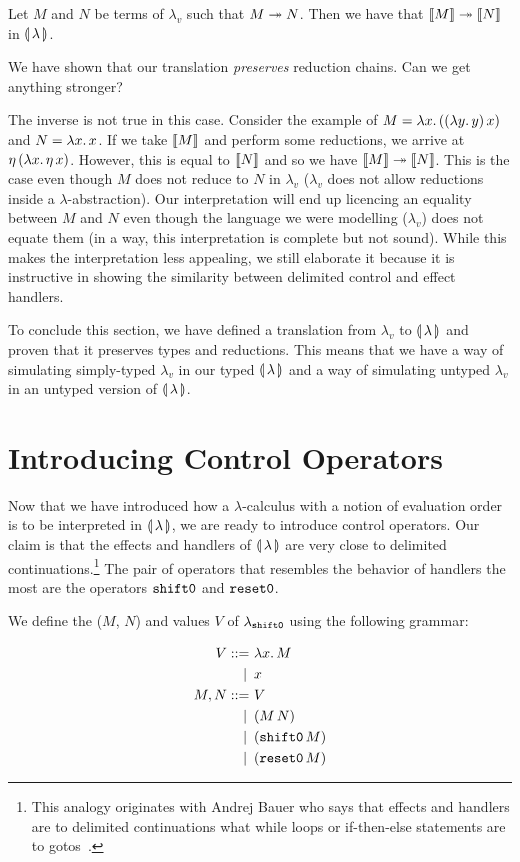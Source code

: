 \begin{corollary}
  Let $M$ and $N$ be terms of $\lambda_v$ such that $M \twoheadrightarrow N$. Then we
  have that $\llbracket M \rrbracket \twoheadrightarrow \llbracket N \rrbracket$ in $\llparenthesis \, \lambda \, \rrparenthesis$.
\end{corollary}

We have shown that our translation \emph{preserves} reduction chains. Can
we get anything stronger?

The inverse is not true in this case. Consider the example of
$M = \lambda x.\, ((\lambda y.\, y)\,x)$ and $N = \lambda x.\, x$. If we take
$\llbracket M \rrbracket$ and perform some reductions, we arrive at
$\eta\,(\lambda x.\, \eta\,x)$. However, this is equal to $\llbracket N \rrbracket$
and so we have $\llbracket M \rrbracket \twoheadrightarrow \llbracket N \rrbracket$. This is the case even though $M$
does not reduce to $N$ in $\lambda_v$ ($\lambda_v$ does not allow
reductions inside a $\lambda$-abstraction). Our interpretation will end up
licencing an equality between $M$ and $N$ even though the language we were
modelling ($\lambda_v$) does not equate them (in a way, this interpretation
is complete but not sound). While this makes the interpretation less
appealing, we still elaborate it because it is instructive in showing the
similarity between delimited control and effect handlers.

To conclude this section, we have defined a translation from $\lambda_v$
to $\llparenthesis \, \lambda \, \rrparenthesis$ and proven that it preserves types and
reductions. This means that we have a way of simulating simply-typed
$\lambda_v$ in our typed $\llparenthesis \, \lambda \, \rrparenthesis$ and a way of simulating untyped
$\lambda_v$ in an untyped version of $\llparenthesis \, \lambda \, \rrparenthesis$.

\section{Introducing Control Operators}
\label{sec:introducing-control-operators}

Now that we have introduced how a $\lambda$-calculus with a notion of
evaluation order is to be interpreted in $\llparenthesis \, \lambda \, \rrparenthesis$, we are ready
to introduce control operators. Our claim is that the effects and handlers
of ${\llparenthesis \, \lambda \, \rrparenthesis}$ are very close to delimited continuations.\footnote{This analogy
  originates with Andrej Bauer who says that effects and handlers are to
  delimited continuations what while loops or if-then-else statements are
  to gotos~\cite{bauer2012lambda}.} The pair of operators that resembles
the behavior of handlers the most are the operators $\mathtt{shift0}$ and
$\mathtt{reset0}$.

\begin{definition}
  We define the  ($M$, $N$) and values $V$ of
  $\lambda_{\mathtt{shift0}}$ using the following grammar:

\begin{align*}
  V ::= &\ \lambda x.\, M \\
   | \, &\ x \\
  M, N ::= &\ V \\
   | \, &\ (M\,N) \\
   | \, &\ (\mathtt{shift0}\,M) \\
   | \, &\ (\mathtt{reset0}\,M)
\end{align*}
\end{definition}


